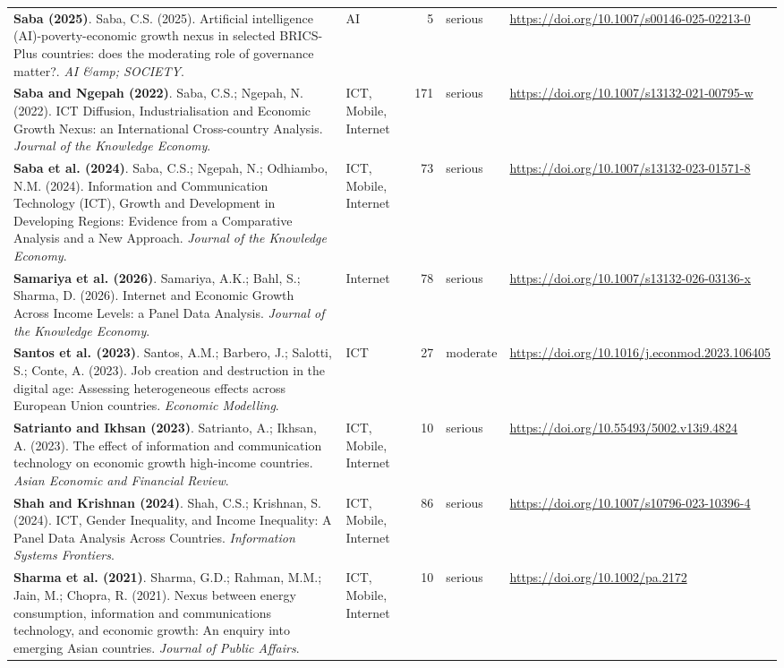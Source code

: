 {\begin{longtable}{@{}p{7.4cm} p{1.3cm} r l p{3.4cm}@{}}
\textbf{Saba (2025)}. Saba, C.S. (2025). Artificial intelligence (AI)-poverty-economic growth nexus in selected BRICS-Plus countries: does the moderating role of governance matter?. \emph{AI \&amp; SOCIETY}. & AI & 5 & serious & \url{https://doi.org/10.1007/s00146-025-02213-0} \\
\textbf{Saba and Ngepah (2022)}. Saba, C.S.; Ngepah, N. (2022). ICT Diffusion, Industrialisation and Economic Growth Nexus: an International Cross-country Analysis. \emph{Journal of the Knowledge Economy}. & ICT, Mobile, Internet & 171 & serious & \url{https://doi.org/10.1007/s13132-021-00795-w} \\
\textbf{Saba et al. (2024)}. Saba, C.S.; Ngepah, N.; Odhiambo, N.M. (2024). Information and Communication Technology (ICT), Growth and Development in Developing Regions: Evidence from a Comparative Analysis and a New Approach. \emph{Journal of the Knowledge Economy}. & ICT, Mobile, Internet & 73 & serious & \url{https://doi.org/10.1007/s13132-023-01571-8} \\
\textbf{Samariya et al. (2026)}. Samariya, A.K.; Bahl, S.; Sharma, D. (2026). Internet and Economic Growth Across Income Levels: a Panel Data Analysis. \emph{Journal of the Knowledge Economy}. & Internet & 78 & serious & \url{https://doi.org/10.1007/s13132-026-03136-x} \\
\textbf{Santos et al. (2023)}. Santos, A.M.; Barbero, J.; Salotti, S.; Conte, A. (2023). Job creation and destruction in the digital age: Assessing heterogeneous effects across European Union countries. \emph{Economic Modelling}. & ICT & 27 & moderate & \url{https://doi.org/10.1016/j.econmod.2023.106405} \\
\textbf{Satrianto and Ikhsan (2023)}. Satrianto, A.; Ikhsan, A. (2023). The effect of information and communication technology on economic growth high-income countries. \emph{Asian Economic and Financial Review}. & ICT, Mobile, Internet & 10 & serious & \url{https://doi.org/10.55493/5002.v13i9.4824} \\
\textbf{Shah and Krishnan (2024)}. Shah, C.S.; Krishnan, S. (2024). ICT, Gender Inequality, and Income Inequality: A Panel Data Analysis Across Countries. \emph{Information Systems Frontiers}. & ICT, Mobile, Internet & 86 & serious & \url{https://doi.org/10.1007/s10796-023-10396-4} \\
\textbf{Sharma et al. (2021)}. Sharma, G.D.; Rahman, M.M.; Jain, M.; Chopra, R. (2021). Nexus between energy consumption, information and communications technology, and economic growth: An enquiry into emerging Asian countries. \emph{Journal of Public Affairs}. & ICT, Mobile, Internet & 10 & serious & \url{https://doi.org/10.1002/pa.2172} \\

\end{longtable}}
